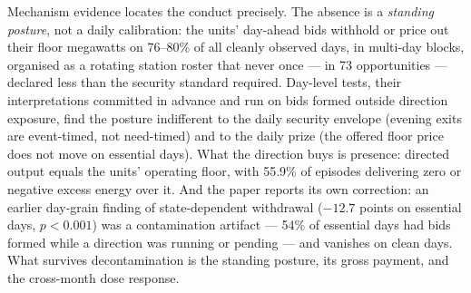 Mechanism evidence locates the conduct precisely. The absence is a
\emph{standing posture}, not a daily calibration: the units' day-ahead bids
withhold or price out their floor megawatts on 76--80\% of all cleanly
observed days, in multi-day blocks, organised as a rotating station roster
that never once --- in 73 opportunities --- declared less than the security
standard required. Day-level tests, their interpretations committed in
advance and run on bids formed
outside direction exposure, find the posture indifferent to the daily
security envelope (evening exits are event-timed, not need-timed) and to the
daily prize (the offered floor price does not move on essential days). What
the direction buys is presence: directed output equals the units' operating
floor, with 55.9\% of episodes delivering zero or negative excess energy
over it. And the
paper reports its own correction: an earlier day-grain finding of
state-dependent withdrawal ($-12.7$ points on essential days, $p<0.001$) was
a contamination artifact --- 54\% of essential days had bids formed while a
direction was running or pending --- and vanishes on clean days. What
survives decontamination is the standing posture, its gross payment, and the
cross-month dose response.


